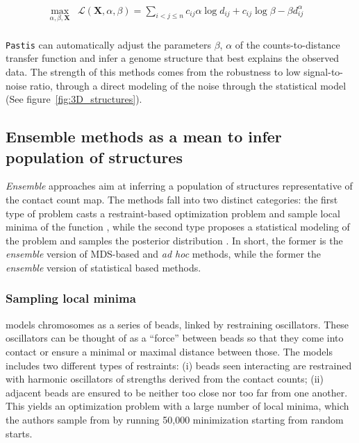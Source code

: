 \documentclass[2columns]{article}
\begin{document}
\begin{equation}
\renewcommand{\arraystretch}{2}
\begin{array}{cll}
\underset{\alpha, \beta, \textbf{X}}{\text{max}} &
\mathcal{L}(\mathbf{X}, \alpha, \beta) = \underset{i<j\leq n}{\sum}  c_{ij}
\alpha \log d_{ij} + c_{ij} \log \beta - \beta d_{ij}^\alpha &\\
\end{array}
\end{equation}


\texttt{Pastis} can automatically adjust the parameters $\beta$, $\alpha$ of
the counts-to-distance transfer function and infer a genome structure that
best explains the observed data. The strength of this methods comes from the
robustness to low signal-to-noise ratio, through a direct modeling of the
noise through the statistical model (See figure~\ref{fig:3D_structures}).


\subsection*{Ensemble methods as a mean to infer population of structures}

{\em Ensemble} approaches aim at inferring a population of structures
representative of the contact count map. The methods fall into two distinct
categories: the first type of problem casts a restraint-based 
optimization problem and sample local minima of the function
\citep{bau:three-dimensional, umbarger:three-dimensional}, while the second
type proposes a statistical modeling of the problem and samples the posterior
distribution \citep{rousseau:three, hu:bayesian}. In short, the former is the
{\em ensemble} version of MDS-based and {\em ad hoc} methods, while the former the
{\em ensemble} version of statistical based methods.

\subsubsection*{Sampling local minima}

\citet{umbarger:three-dimensional,bau:three-dimensional, kalhor:genome} models
chromosomes as a series of beads, linked by restraining oscillators. These
oscillators can be thought of as a ``force'' between beads so that they come
into contact or ensure a minimal or maximal distance between those. The models
includes two different types of restraints: (i) beads seen interacting are
restrained with harmonic oscillators of strengths derived from the contact
counts; (ii) adjacent beads are ensured to be neither too close nor too far
from one another.  This yields an optimization problem with a large number of
local minima, which the authors sample from by running 50,000 minimization
starting from random starts.
\end{document}
